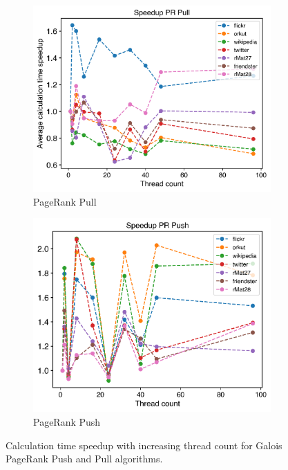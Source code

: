 \begin{figure}
	\hfil
	\begin{subfigure}{0.32\textwidth}
		\includegraphics[width=\linewidth]{../../plots/singleNodePRPullGaloisThreads.png}
		\caption{PageRank Pull}
		\label{fig:galoisSpeedupPRPull}
	\end{subfigure}
	\hfil
	\begin{subfigure}{0.32\textwidth}
		\includegraphics[width=\linewidth]{../../plots/singleNodePRPushGaloisThreads.png}
		\caption{PageRank Push}
		\label{fig:galoisSpeedupPRPush}
	\end{subfigure}
	\hfil
	\caption{Calculation time speedup with increasing thread count for Galois PageRank Push and Pull algorithms.}
\end{figure}


